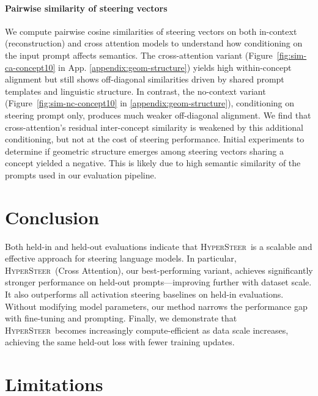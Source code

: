 \documentclass[11pt]{article}
\newcommand{\methodname}{\textsc{HyperSteer}}
\begin{document}
\paragraph{Pairwise similarity of steering vectors}
We compute pairwise cosine similarities of steering vectors on both in-context (reconstruction) and cross attention models to understand how conditioning on the input prompt affects semantics.
The cross-attention variant (Figure~\ref{fig:sim-ca-concept10} in App. \ref{appendix:geom-structure}) yields high within-concept alignment but still shows off-diagonal similarities driven by shared prompt templates and linguistic structure. In contrast, the no-context variant (Figure~\ref{fig:sim-nc-concept10} in \ref{appendix:geom-structure}), conditioning on steering prompt only, produces much weaker off-diagonal alignment. We find that cross-attention’s residual inter-concept similarity is weakened by this additional conditioning, but not at the cost of steering performance. Initial experiments to determine if geometric structure emerges among steering vectors sharing a concept yielded a negative. This is likely due to high semantic similarity of the prompts used in our evaluation pipeline. 


\section{Conclusion}

Both held-in and held-out evaluations indicate that \methodname\ is a scalable and effective approach for steering language models. In particular, \methodname\ (Cross Attention), our best-performing variant, achieves significantly stronger performance on held-out prompts—improving further with dataset scale. It also outperforms all activation steering baselines on held-in evaluations. Without modifying model parameters, our method narrows the performance gap with fine-tuning and prompting. Finally, we demonstrate that \methodname\ becomes increasingly compute-efficient as data scale increases, achieving the same held-out loss with fewer training updates.




\section{Limitations}
\end{document}
